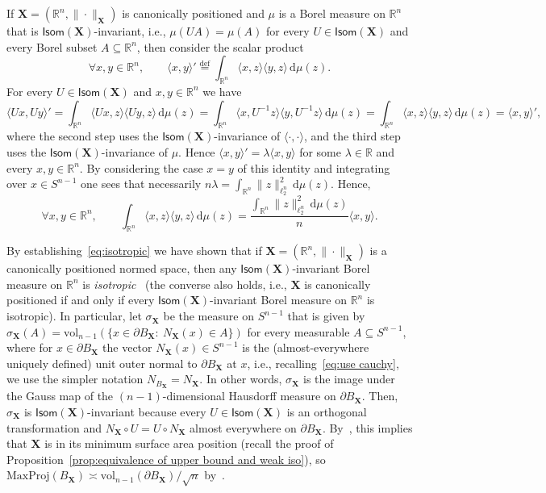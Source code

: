 \documentclass[11pt,reqno]{amsart}
\newcommand{\ud}[0]{\,\mathrm{d}}
\newcommand{\X}{\mathbf X}
\newcommand{\R}{\mathbb R}
\theoremstyle{remark}
\renewcommand{\subset}{\subseteq}
\newcommand{\eqdef}{\stackrel{\mathrm{def}}{=}}
\newcommand{\vol}{\mathrm{vol}}
\renewcommand{\1}{\mathbf 1}
\begin{document}
If $\X=(\R^n,\|\cdot\|_\X)$ is canonically positioned and $\mu$ is a Borel measure on $\R^n$ that is $\mathsf{Isom}(\X)$-invariant, i.e., $\mu(UA)=\mu(A)$ for every $U\in \mathsf{Isom}(\X)$ and every Borel subset $A\subset \R^n$, then consider the scalar product
$$
\forall x,y\in \R^n,\qquad \langle x,y\rangle'\eqdef \int_{\R^n} \langle x,z\rangle \langle y,z\rangle\ud\mu(z).
$$
For every $U\in \mathsf{Isom}(\X)$ and $x,y\in \R^n$ we have
$$
\langle Ux,Uy\rangle'=\int_{\R^n} \langle Ux,z\rangle \langle Uy,z\rangle\ud\mu(z)=\int_{\R^n} \langle x,U^{-1}z\rangle \langle y,U^{-1}z\rangle\ud\mu(z)=\int_{\R^n} \langle x,z\rangle \langle y,z\rangle\ud\mu(z)=\langle x,y\rangle',
$$
where the second step uses the   $\mathsf{Isom}(\X)$-invariance of $\langle\cdot,\cdot\rangle$, and the third step uses the $\mathsf{Isom}(\X)$-invariance of $\mu$. Hence $\langle x,y\rangle'=\lambda\langle x,y\rangle$ for some $\lambda\in \R$ and every $x,y\in \R^n$. By considering the case $x=y$ of this identity and integrating over $x\in S^{n-1}$ one sees that necessarily $n\lambda=\int_{\R^n} \|z\|_{\ell_2^n}^2\ud\mu(z)$. Hence,
\begin{equation}\label{eq:isotropic}
\forall x,y\in \R^n, \qquad \int_{\R^n} \langle x,z\rangle \langle y,z\rangle\ud\mu(z)=\frac{\int_{\R^n} \|z\|_{\ell_2^n}^2\ud\mu(z)}{n}\langle x,y\rangle.
\end{equation}

By establishing~\eqref{eq:isotropic} we have shown that if $\X=(\R^n,\|\cdot\|_\X)$ is a canonically positioned normed space, then any $\mathsf{Isom}(\X)$-invariant Borel measure on $\R^n$ is {\em isotropic}~\cite{GM00,BGVV14} (the converse also holds, i.e., $\X$  is canonically positioned if and only if every $\mathsf{Isom}(\X)$-invariant Borel measure on $\R^n$ is isotropic). In particular, let $\sigma_\X$ be the measure on $S^{n-1}$ that is given by $\sigma_\X(A)=\vol_{n-1}(\{x\in \partial B_\X:\ N_\X(x)\in A\})$ for every measurable $A\subset S^{n-1}$, where for $x\in \partial B_\X$ the vector $N_\X(x)\in S^{n-1}$ is the (almost-everywhere uniquely defined) unit outer normal to $\partial B_\X$ at $x$, i.e., recalling~\eqref{eq:use cauchy}, we use the simpler notation $N_{B_\X}=N_\X$. In other words, $\sigma_\X$ is the image under the Gauss map of the $(n-1)$-dimensional Hausdorff measure on $\partial B_\X$. Then, $\sigma_\X$ is $\mathsf{Isom}(\X)$-invariant because every $U\in \mathsf{Isom}(\X)$ is an orthogonal transformation and $N_\X\circ U=U\circ N_\X$ almost everywhere on $\partial B_\X$. By~\cite{Pet61}, this implies that $\X$ is in its minimum surface area position (recall the proof of Proposition~\ref{prop:equivalence of upper bound and weak iso}), so $\mathrm{MaxProj}(B_\X)\asymp \vol_{n-1}(\partial B_\X)/\sqrt{n}$ by~\cite[Proposition~3.1]{GP99}.
\end{document}
